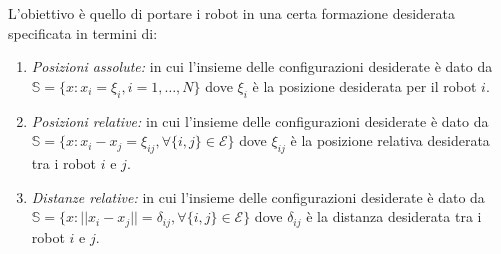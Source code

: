 L'obiettivo \`e quello di portare i robot in una certa formazione desiderata specificata in termini di:
\begin{enumerate}
\item \textit{Posizioni assolute:} in cui l'insieme delle configurazioni desiderate \`e dato da $\mathbb{S} = \{ x: x_i = \xi_i, i = 1, \dots, N\}$ dove $\xi_i$ \`e la posizione desiderata per il robot $i$.
\item \textit{Posizioni relative:} in cui l'insieme delle configurazioni desiderate \`e dato da $\mathbb{S} = \{x : x_i - x_j = \xi_{ij}, \forall \{i,j\} \in \mathcal{E} \}$ dove $\xi_{ij}$ \`e la posizione relativa desiderata tra i robot $i$ e $j$.
\item \textit{Distanze relative:} in cui l'insieme delle configurazioni desiderate \`e dato da $\mathbb{S} = \{x: ||x_i - x_j|| = \delta_{ij}, \forall \{i,j\} \in \mathcal{E} \}$ dove $\delta_{ij}$ \`e la distanza desiderata tra i robot $i$ e $j$.
\end{enumerate}

